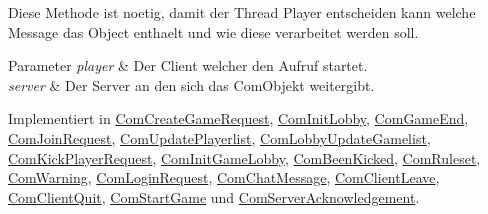 Diese Methode ist noetig, damit der Thread Player entscheiden kann welche Message das Object enthaelt und wie diese verarbeitet werden soll. 


\begin{DoxyParams}{Parameter}
{\em player} & Der Client welcher den Aufruf startet. \\
\hline
{\em server} & Der Server an den sich das Com\-Objekt weitergibt. \\
\hline
\end{DoxyParams}


Implementiert in \hyperlink{a00029_ac67b5ce3ec03d48ef1e6caad6e49c902}{Com\-Create\-Game\-Request}, \hyperlink{a00032_ac67b5ce3ec03d48ef1e6caad6e49c902}{Com\-Init\-Lobby}, \hyperlink{a00030_ac67b5ce3ec03d48ef1e6caad6e49c902}{Com\-Game\-End}, \hyperlink{a00033_ac67b5ce3ec03d48ef1e6caad6e49c902}{Com\-Join\-Request}, \hyperlink{a00041_ac67b5ce3ec03d48ef1e6caad6e49c902}{Com\-Update\-Playerlist}, \hyperlink{a00035_ac67b5ce3ec03d48ef1e6caad6e49c902}{Com\-Lobby\-Update\-Gamelist}, \hyperlink{a00034_ac67b5ce3ec03d48ef1e6caad6e49c902}{Com\-Kick\-Player\-Request}, \hyperlink{a00031_ac67b5ce3ec03d48ef1e6caad6e49c902}{Com\-Init\-Game\-Lobby}, \hyperlink{a00025_ac67b5ce3ec03d48ef1e6caad6e49c902}{Com\-Been\-Kicked}, \hyperlink{a00038_ac67b5ce3ec03d48ef1e6caad6e49c902}{Com\-Ruleset}, \hyperlink{a00042_ac67b5ce3ec03d48ef1e6caad6e49c902}{Com\-Warning}, \hyperlink{a00036_ac67b5ce3ec03d48ef1e6caad6e49c902}{Com\-Login\-Request}, \hyperlink{a00026_ac67b5ce3ec03d48ef1e6caad6e49c902}{Com\-Chat\-Message}, \hyperlink{a00027_ac67b5ce3ec03d48ef1e6caad6e49c902}{Com\-Client\-Leave}, \hyperlink{a00028_ac67b5ce3ec03d48ef1e6caad6e49c902}{Com\-Client\-Quit}, \hyperlink{a00040_ac67b5ce3ec03d48ef1e6caad6e49c902}{Com\-Start\-Game} und \hyperlink{a00039_ac67b5ce3ec03d48ef1e6caad6e49c902}{Com\-Server\-Acknowledgement}.

